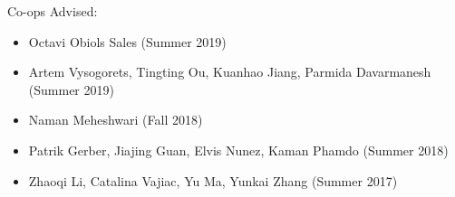 \vspace{-0.3in}

Co-ops Advised:
\begin{itemize}
 \itemsep 0pt
        \item Octavi Obiols Sales (Summer 2019)
	\item Artem Vysogorets, Tingting Ou, Kuanhao Jiang, Parmida Davarmanesh (Summer 2019) 
        \item Naman Meheshwari (Fall 2018)
	\item Patrik Gerber, Jiajing Guan, Elvis Nunez, Kaman Phamdo (Summer 2018)
	\item Zhaoqi Li, Catalina Vajiac, Yu Ma, Yunkai Zhang (Summer 2017)
\end{itemize}


